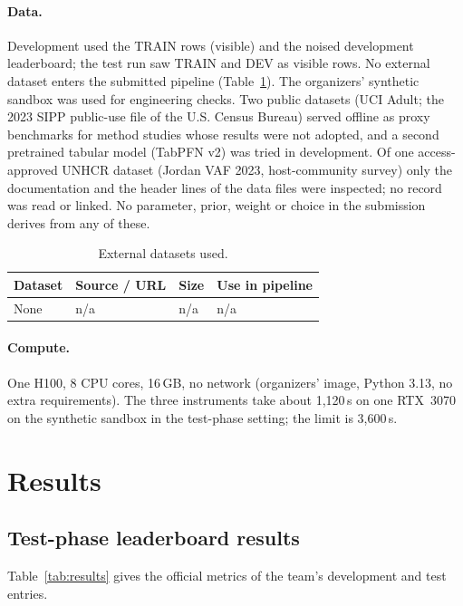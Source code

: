 \documentclass{article}
\begin{document}
\paragraph{Data.} Development used the TRAIN rows (visible) and the noised development
leaderboard; the test run saw TRAIN and DEV as visible rows. No external dataset enters the
submitted pipeline (Table~\ref{tab:external}). The organizers' synthetic sandbox was used
for engineering checks. Two public datasets (UCI Adult; the 2023 SIPP public-use file of the
U.S. Census Bureau) served offline as proxy benchmarks for method studies whose results were
not adopted, and a second pretrained tabular model (TabPFN v2) was tried in development. Of one
access-approved UNHCR dataset (Jordan VAF 2023, host-community survey) only the documentation
and the header lines of the data files were inspected; no record was read or linked. No
parameter, prior, weight or choice in the submission derives from any of these.

\begin{table}[h]
  \centering
  \small
  \caption{External datasets used.}
  \label{tab:external}
  \begin{tabular}{llll}
    \toprule
    Dataset & Source / URL & Size & Use in pipeline \\
    \midrule
    None & n/a & n/a & n/a \\
    \bottomrule
  \end{tabular}
\end{table}

\paragraph{Compute.} One H100, 8 CPU cores, 16\,GB, no network (organizers' image, Python
3.13, no extra requirements). The three instruments take about 1,120\,s on one RTX~3070 on
the synthetic sandbox in the test-phase setting; the limit is 3,600\,s.

\section{Results}
\label{sec:results}

\subsection{Test-phase leaderboard results}
Table~\ref{tab:results} gives the official metrics of the team's development and test entries.
\end{document}
